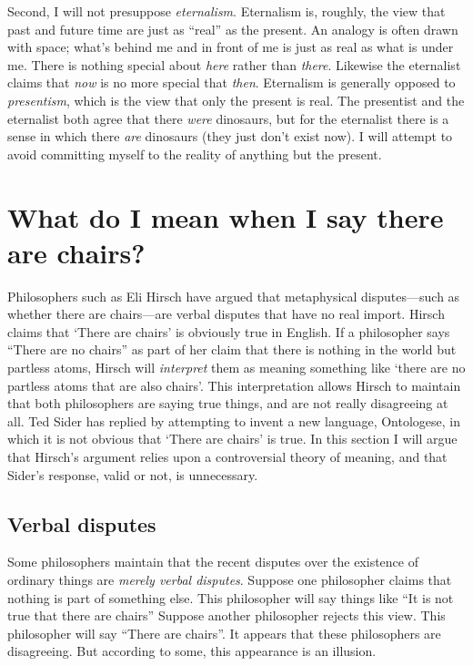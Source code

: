 \documentclass[12pt,twoside]{reedfancy}
\begin{document}
\begin{spacing}{1.25}
Second, I will not presuppose {\em eternalism}.  Eternalism is,
roughly, the view that past and future time are just as ``real'' as
the present.  An analogy is often drawn with space; what's behind me
and in front of me is just as real as what is under me.  There is
nothing special about {\em here} rather than {\em there}.  Likewise
the eternalist claims that {\em now} is no more special that {\em
  then}.  Eternalism is generally opposed to {\em presentism}, which
is the view that only the present is real.  The presentist and the
eternalist both agree that there {\em were} dinosaurs, but for the
eternalist there is a sense in which there {\em are} dinosaurs (they
just don't exist now).  I will attempt to avoid committing myself to
the reality of anything but the present.


\chapter{What do I mean when I say there are chairs?}
%
\fancyhead[CO]{\textit{\thetitle}}
\renewcommand{\headrulewidth}{0.0pt}
\label{verbal}
Philosophers such as Eli Hirsch have argued that metaphysical
disputes---such as whether there are chairs---are verbal disputes that
have no real import.  Hirsch claims that `There are chairs' is
obviously true in English.  If a philosopher says ``There are no
chairs'' as part of her claim that there is nothing in the world but
partless atoms, Hirsch will {\em interpret} them as meaning something
like `there are no partless atoms that are also chairs'.  This
interpretation allows Hirsch to maintain that both philosophers are
saying true things, and are not really disagreeing at all.  Ted Sider
has replied by attempting to invent a new language, Ontologese, in
which it is not obvious that `There are chairs' is true.  In this
section I will argue that Hirsch's argument relies upon a
controversial theory of meaning, and that Sider's response, valid or
not, is unnecessary.

\section{Verbal disputes}
\label{hirsch}
Some philosophers maintain that the recent disputes over the existence
of ordinary things are {\em merely verbal disputes}.  Suppose one
philosopher claims that nothing is part of something else.  This
philosopher will say things like ``It is not true that there are
chairs'' Suppose another philosopher rejects this view.  This
philosopher will say ``There are chairs''.  It appears that these
philosophers are disagreeing.  But according to some, this appearance
is an illusion.


\end{spacing}
\end{document}
